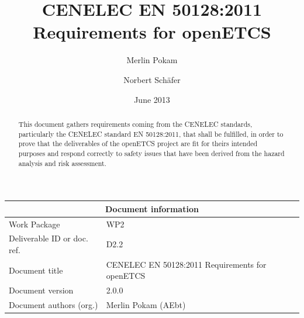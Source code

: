\documentclass{template/openetcs_report}
\begin{document}
\frontmatter
{}




\title{CENELEC EN 50128:2011 Requirements for openETCS}


\date{June 2013}

\author{Merlin Pokam \and Norbert Sch\"afer}






\begin{abstract}
This document gathers requirements coming from the CENELEC standards, particularly the CENELEC standard EN 50128:2011, that shall be fulfilled, in order to prove that the deliverables of the openETCS project are fit for theirs intended purposes and respond correctly to safety issues that have been derived from the hazard analysis and risk assessment.
\end{abstract}

\maketitle

\begin{tabular}{|p{4.4cm}|p{8.7cm}|}
\hline
\multicolumn{2}{|c|}{\textbf{Document information}} \\
\hline
Work Package &  WP2  \\
Deliverable ID or doc. ref. & D2.2\\
\hline
Document title & CENELEC EN 50128:2011 Requirements for openETCS \\
Document version & 2.0.0 \\
Document authors (org.)  & Merlin Pokam (AEbt) \\
\hline
\end{tabular}
\end{document}
